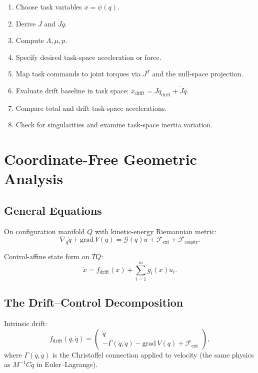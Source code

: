 \documentclass[11pt]{article}
\begin{document}
\begin{enumerate}
\item Choose task variables $x=\psi(q)$.
\item Derive $J$ and $\dot{J}\dot{q}$.
\item Compute $\Lambda,\mu,p$.
\item Specify desired task-space acceleration or force.
\item Map task commands to joint torques via $J^T$ and the null-space projection.
\item Evaluate drift baseline in task space: $\ddot{x}_{\mathrm{drift}}=J\ddot{q}_{\mathrm{drift}}+\dot{J}\dot{q}$.
\item Compare total and drift task-space accelerations.
\item Check for singularities and examine task-space inertia variation.
\end{enumerate}


\section{Coordinate-Free Geometric Analysis}\label{sec:geometric}

\subsection{General Equations}

On configuration manifold $Q$ with kinetic-energy Riemannian metric:
\begin{equation}\label{eq:geo-eom}
\nabla_{\dot{q}}\dot{q} + \mathrm{grad}\,V(q) = \mathcal{G}(q)u + \mathcal{F}_{\mathrm{ext}} + \mathcal{F}_{\mathrm{constr}}.
\end{equation}

Control-affine state form on $TQ$:
\begin{equation}\label{eq:geo-affine}
\dot{x} = f_{\mathrm{drift}}(x) + \sum_{i=1}^{m}g_i(x)u_i.
\end{equation}

\subsection{The Drift--Control Decomposition}

Intrinsic drift:
\begin{equation}\label{eq:geo-drift}
f_{\mathrm{drift}}(q,\dot{q}) = \begin{pmatrix}\dot{q}\\-\Gamma(\dot{q},\dot{q})-\mathrm{grad}\,V(q)+\mathcal{F}_{\mathrm{ext}}\end{pmatrix},
\end{equation}
where $\Gamma(\dot{q},\dot{q})$ is the Christoffel connection applied to velocity (the same physics as $M^{-1}C\dot{q}$ in Euler--Lagrange).
\end{document}
